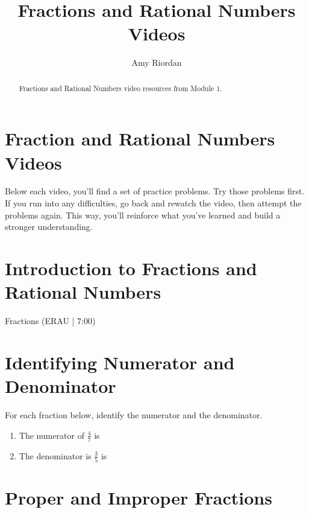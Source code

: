\documentclass{ximera}
\title{Fractions and Rational Numbers Videos}
\author{Amy Riordan}
\begin{document}
\begin{abstract}
Fractions and Rational Numbers video resources from Module 1.
\end{abstract}
\maketitle

\section*{Fraction and Rational Numbers Videos}

Below each video, you’ll find a set of practice problems. Try those problems first. If you run into any difficulties, go back and rewatch the video, then attempt the problems again. This way, you’ll reinforce what you’ve learned and build a stronger understanding.

\section*{Introduction to Fractions and Rational Numbers}

Fractions (ERAU | 7:00)



\section*{Identifying Numerator and Denominator}

For each fraction below, identify the numerator and the denominator.

\begin{problem}
\begin{enumerate}
\item The numerator of $\frac{4}{7}$ is 
 
\item The denominator is $\frac{3}{5}$ is 
 
\end{enumerate}
\end{problem}


\section*{Proper and Improper Fractions}
\end{document}
